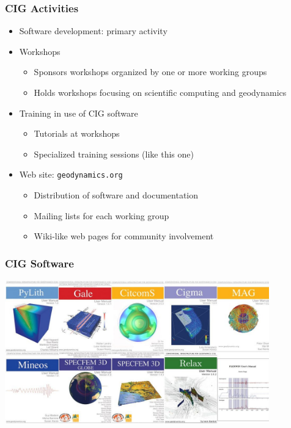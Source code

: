 \documentclass[aspectratio=169]{beamer}
\begin{document}
\begin{frame}
  \frametitle{CIG Activities}
  \summary{}

  \begin{itemize}
  \item Software development: primary activity
  \item Workshops
    \begin{itemize}
    \item Sponsors workshops organized by one or more working groups
    \item Holds workshops focusing on scientific computing and geodynamics
    \end{itemize}
  \item Training in use of CIG software
    \begin{itemize}
    \item Tutorials at workshops
    \item Specialized training sessions (like this one)
    \end{itemize}
  \item Web site: {\tt geodynamics.org}
    \begin{itemize}
    \item Distribution of software and documentation
    \item Mailing lists for each working group
    \item Wiki-like web pages for community involvement
    \end{itemize}
  \end{itemize}
 
\end{frame}


\begin{frame}
  \frametitle{CIG Software}
  \summary{}

  \vfill
  \begin{center}
    \includegraphics[width=4.5in]{figs/covers}
  \end{center}
  \vfill

\end{frame}
\end{document}
